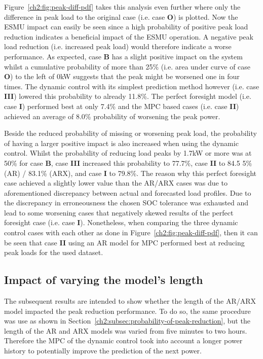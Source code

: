 

Figure~\ref{ch2:fig:peak-diff-pdf} takes this analysis even further where only the difference in peak load to the original case (i.e. case \textbf{O}) is plotted.
Now the ESMU impact can easily be seen since a high probability of positive peak load reduction indicates a beneficial impact of the ESMU operation.
A negative peak load reduction (i.e. increased peak load) would therefore indicate a worse performance.
As expected, case \textbf{B} has a slight positive impact on the system whilst a cumulative probability of more than 25\% (i.e. area under curve of case \textbf{O}) to the left of 0kW suggests that the peak might be worsened one in four times.
The dynamic control with its simplest prediction method however (i.e. case \textbf{III}) lowered this probability to already 11.8\%.
The perfect foresight model (i.e. case \textbf{I}) performed best at only 7.4\% and the MPC based cases (i.e. case \textbf{II}) achieved an average of 8.0\% probability of worsening the peak power.

Beside the reduced probability of missing or worsening peak load, the probability of having a larger positive impact is also increased when using the dynamic control.
Whilst the probability of reducing load peaks by 1.7kW or more was at 50\% for case \textbf{B}, case \textbf{III} increased this probability to 77.7\%, case \textbf{II} to 84.5 5\% (AR) / 83.1\% (ARX), and case \textbf{I} to 79.8\%.
The reason why this perfect foresight case achieved a slightly lower value than the AR/ARX cases was due to aforementioned discrepancy between actual and forecasted load profiles.
Due to the discrepancy in erroneousness the chosen SOC tolerance was exhausted and lead to some worsening cases that negatively skewed results of the perfect foresight case (i.e. case \textbf{I}).
Nonetheless, when comparing the three dynamic control cases with each other as done in Figure~\ref{ch2:fig:peak-diff-pdf}, then it can be seen that case \textbf{II} using an AR model for MPC performed best at reducing peak loads for the used dataset.

\subsection{Impact of varying the model's length}

The subsequent results are intended to show whether the length of the AR/ARX model impacted the peak reduction performance.
To do so, the same procedure was use as shown in Section~\ref{ch2:subsec:probability-of-peak-reduction}, but the length of the AR and ARX models was varied from five minutes to two hours.
Therefore the MPC of the dynamic control took into account a longer power history to potentially improve the prediction of the next power.

